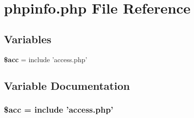 \section{phpinfo.php File Reference}
\label{phpinfo_8php}


\subsection*{Variables}
\begin{CompactItemize}
\item 
{\bf \$acc} = include 'access.php'
\end{CompactItemize}


\subsection{Variable Documentation}
\subsubsection{\setlength{\rightskip}{0pt plus 5cm}\$acc = include 'access.php'}\label{phpinfo_8php_542926c588a05eb69553d79c83cf73da}


